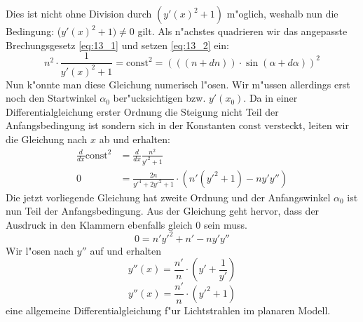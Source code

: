 \begin{refsection}
Dies ist nicht ohne Division durch $(y'(x)^2 + 1)$ m"oglich, weshalb nun die Bedingung: ($y'(x)^2 +1) \neq 0$ gilt.
Als n"achstes quadrieren wir das angepasste Brechungsgesetz \ref{eq:13_1} und setzen \ref{eq:13_2} ein:
$$n^2 \cdot \frac{1}{y'(x)^2 + 1} = \text{const}^2 = (((n + dn)) \cdot \sin(\alpha + d\alpha))^2$$
Nun k"onnte man diese Gleichung numerisch l"osen. 
Wir m"ussen allerdings erst noch den Startwinkel $\alpha_0$ ber"ucksichtigen bzw. $y'(x_0)$.
Da in einer Differentialgleichung erster Ordnung die Steigung nicht Teil der Anfangsbedingung ist sondern sich in der Konstanten $\text{const}$ versteckt, leiten wir die Gleichung nach $x$ ab und erhalten:
\begin{equation}
\begin{aligned}
\frac{d}{dx} \text{const}^2 
& = \frac{d}{dx} \frac{n^2}{y'^2 + 1}  \\
0 
& = \frac{2n}{y'^4 + 2y'^2 + 1} \cdot \left( n'(y'^2 + 1) - n y' y'' \right)
\end{aligned}
\end{equation}
Die jetzt vorliegende Gleichung hat zweite Ordnung und der Anfangswinkel $\alpha_0$ ist nun Teil der Anfangsbedingung. 
Aus der Gleichung geht hervor, dass der Ausdruck in den Klammern ebenfalls gleich $0$ sein muss.
$$0 = n' y'^2 + n' - n y' y''$$
Wir l"osen nach $y''$ auf und erhalten 
$$y''(x) = \frac{n'}{n} \cdot \left( y' + \frac{1}{y'} \right)$$
\begin{equation} \label{eq:planar_DGL}
y''(x) = \frac{n'}{n} \cdot \left( y'^2 + 1\right)
\end{equation}
eine allgemeine Differentialgleichung f"ur Lichtstrahlen im planaren Modell.


\end{refsection}

